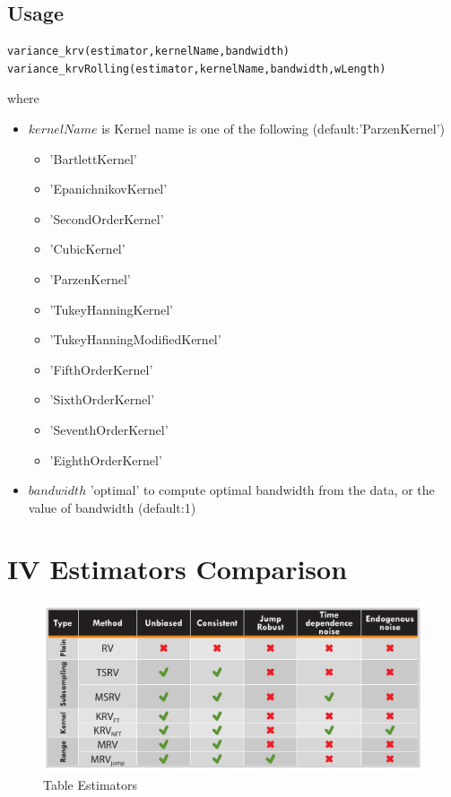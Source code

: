\documentclass[letterpaper]{report}
\newcounter{N}
\begin{document}
  \subsection{Usage}
\begin{lstlisting}
variance_krv(estimator,kernelName,bandwidth)
variance_krvRolling(estimator,kernelName,bandwidth,wLength)
\end{lstlisting}
where

\begin{itemize}
\item $kernelName$ is Kernel name is one of the following (default:'ParzenKernel')
  \begin{itemize}
\item 'BartlettKernel'
\item 'EpanichnikovKernel'
\item 'SecondOrderKernel'
\item 'CubicKernel' 
\item 'ParzenKernel'
\item 'TukeyHanningKernel'	 
\item 'TukeyHanningModifiedKernel'
\item 'FifthOrderKernel'
\item 'SixthOrderKernel'
\item 'SeventhOrderKernel' 
\item 'EighthOrderKernel' 	 
\end{itemize}
\item $bandwidth$ 'optimal' to compute optimal bandwidth from the data, or the value of bandwidth (default:1)
\end{itemize}
\section{IV Estimators Comparison}
\thispagestyle{plain}
\begin{figure}[H]
\noindent 

\centering
\noindent
\includegraphics[scale=0.7]{img/Table}

\caption{Table Estimators}
\label{pic:TableEstimators}
\end{figure}
\end{document}
